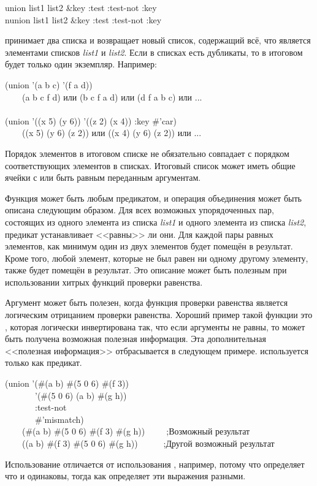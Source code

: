 \begin{defun}[Функция]
union list1 list2 &key :test :test-not :key \\
nunion list1 list2 &key :test :test-not :key

 принимает два списка и возвращает новый список, содержащий всё, что
является элементами списков \emph{list1} и \emph{list2}.
Если в списках есть дубликаты, то в итоговом будет только один экземпляр.
Например:
\begin{lisp}
(union '(a b c) '(f a d)) \\
~~~\EV\ (a b c f d) \textrm{или} (b c f a d) \textrm{или} (d f a b c) \textrm{или} ... \\
 \\
(union '((x 5) (y 6)) '((z 2) (x 4)) :key \#'car) \\
~~~\EV\ ((x 5) (y 6) (z 2)) \textrm{или} ((x 4) (y 6) (z 2)) \textrm{или} ...
\end{lisp}

Порядок элементов в итоговом списке не обязательно совпадает с порядком
соответствующих элементов в списках.
Итоговый список может иметь общие ячейки с или быть равным  переданным
аргументам.

Функция  может быть любым предикатом, и операция объединения может
быть описана следующим образом. Для всех возможных упорядоченных пар, состоящих
из одного элемента из списка \emph{list1} и одного элемента из списка
\emph{list2}, предикат устанавливает <<равны>> ли они. Для каждой пары равных
элементов, как минимум один из двух элементов будет помещён в результат. Кроме
того, любой элемент, которые не был равен ни одному другому элементу, также
будет помещён в результат. Это описание может быть полезным при использовании
хитрых функций проверки равенства.

Аргумент  может быть полезен, когда функция проверки равенства
является логическим отрицанием проверки равенства. Хороший пример такой функции
это , которая логически инвертирована так, что если аргументы не
равны, то может быть получена возможная полезная информация. Эта дополнительная
<<полезная информация>> отбрасывается в следующем примере. 
используется только как предикат.
\begin{lisp}
(union '(\#(a b) \#(5 0 6) \#(f 3)) \\
~~~~~~~'(\#(5 0 6) (a b) \#(g h)) \\
~~~~~~~:test-not \\
~~~~~~~\#'mismatch) \\
~~~\EV\ (\#(a b) \#(5 0 6) \#(f 3) \#(g h))~~~~~;\textrm{Возможный результат} \\
~~~\EV\ ((a b) \#(f 3) \#(5 0 6) \#(g h))~~~~~~;\textrm{Другой возможный результат}
\end{lisp}
Использование  отличается от использования
, например, потому что  определяет что
 и  одинаковы, тогда как  определяет эти
выражения разными.


\end{defun}
